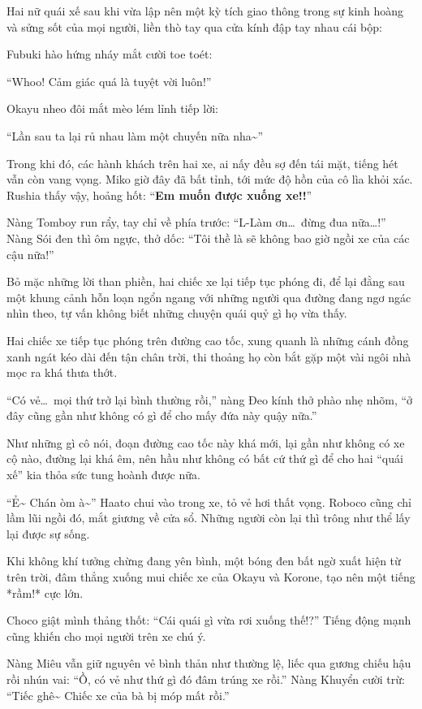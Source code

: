 \documentclass[../main.tex]{subfiles}
\begin{document}
Hai nữ quái xế sau khi vừa lập nên một kỳ tích giao thông trong sự kinh hoàng và sửng sốt của mọi người, liền thò tay qua cửa kính đập tay nhau cái bộp:

Fubuki hào hứng nháy mắt cười toe toét:

``Whoo! Cảm giác quá là tuyệt vời luôn!''

Okayu nheo đôi mắt mèo lém lỉnh tiếp lời:

``Lần sau ta lại rủ nhau làm một chuyến nữa nha\~{}''

Trong khi đó, các hành khách trên hai xe, ai nấy đều sợ đến tái mặt, tiếng hét vẫn còn vang vọng. Miko giờ đây đã bất tỉnh, tới mức độ hồn của cô lìa khỏi xác. Rushia thấy vậy, hoảng hốt: ``\textbf{Em muốn được xuống xe!!}''

Nàng Tomboy run rẩy, tay chỉ về phía trước: ``L-Làm ơn\dots\ đừng đua nữa\dots!'' Nàng Sói đen thì ôm ngực, thở dốc: ``Tôi thề là sẽ không bao giờ ngồi xe của các cậu nữa!''

Bỏ mặc những lời than phiền, hai chiếc xe lại tiếp tục phóng đi, để lại đằng sau một khung cảnh hỗn loạn ngổn ngang với những người qua đường đang ngơ ngác nhìn theo, tự vấn không biết những chuyện quái quỷ gì họ vừa thấy.

\ct

Hai chiếc xe tiếp tục phóng trên đường cao tốc, xung quanh là những cánh đồng xanh ngát kéo dài đến tận chân trời, thi thoảng họ còn bắt gặp một vài ngôi nhà mọc ra khá thưa thớt.

``Có vẻ\dots\ mọi thứ trở lại bình thường rồi,'' nàng Đeo kính thở phào nhẹ nhõm, ``ở đây cũng gần như không có gì để cho mấy đứa này quậy nữa.''

Như những gì cô nói, đoạn đường cao tốc này khá mới, lại gần như không có xe cộ nào, đường lại khá êm, nên hầu như không có bất cứ thứ gì để cho hai ``quái xế'' kia thỏa sức tung hoành được nữa.

``Ẻ\~{} Chán òm à\~{}'' Haato chui vào trong xe, tỏ vẻ hơi thất vọng. Roboco cũng chỉ lầm lũi ngồi đó, mắt giương về cửa sổ. Những người còn lại thì trông như thể lấy lại được sự sống.

Khi không khí tưởng chừng đang yên bình, một bóng đen bất ngờ xuất hiện từ trên trời, đâm thẳng xuống mui chiếc xe của Okayu và Korone, tạo nên một tiếng *rầm!* cực lớn.

Choco giật mình thảng thốt: ``Cái quái gì vừa rơi xuống thế!?'' Tiếng động mạnh cũng khiến cho mọi người trên xe chú ý.

Nàng Miêu vẫn giữ nguyên vẻ bình thản như thường lệ, liếc qua gương chiếu hậu rồi nhún vai: ``Ồ, có vẻ như thứ gì đó đâm trúng xe rồi.'' Nàng Khuyển cười trừ: ``Tiếc ghê\~{} Chiếc xe của bà bị móp mất rồi.''
\end{document}
